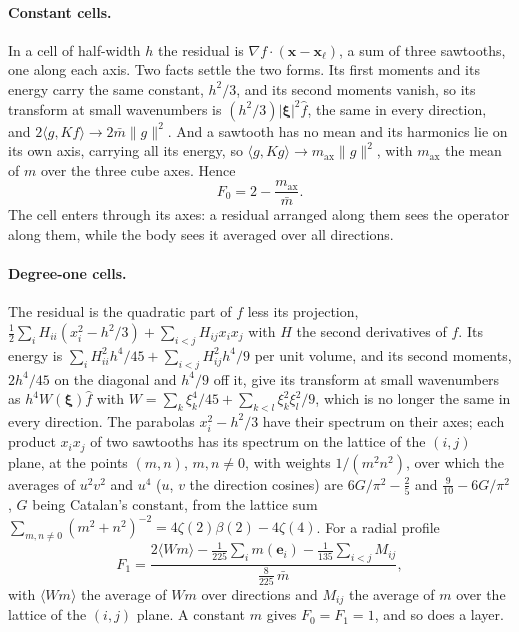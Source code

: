 \documentclass[11pt,a4paper]{article}
\newcommand{\bx}{\mathbf{x}}
\begin{document}
\paragraph{Constant cells.} In a cell of half-width $h$ the residual is $\nabla f\cdot(\bx-\bx_\ell)$, a
sum of three sawtooths, one along each axis. Two facts settle the two forms. Its first moments and its
energy carry the same constant, $h^2/3$, and its second moments vanish, so its transform at small
wavenumbers is $(h^2/3)\lvert\boldsymbol\xi\rvert^2\hat f$, the same in every direction, and
$2\langle g,Kf\rangle\to2\bar m\lVert g\rVert^2$. And a sawtooth has no mean and its harmonics lie
on its own axis, carrying all its energy, so $\langle g,Kg\rangle\to m_{\mathrm{ax}}\lVert
g\rVert^2$, with $m_{\mathrm{ax}}$ the mean of $m$ over the three cube axes. Hence
\begin{equation}\label{eq:F0}
  F_0=2-\frac{m_{\mathrm{ax}}}{\bar m}.
\end{equation}
The cell enters through its axes: a residual arranged along them sees the operator along them, while the
body sees it averaged over all directions.

\paragraph{Degree-one cells.} The residual is the quadratic part of $f$ less its projection,
$\tfrac12\sum_iH_{ii}(x_i^2-h^2/3)+\sum_{i<j}H_{ij}x_ix_j$ with $H$ the second derivatives of $f$.
Its energy is $\sum_iH_{ii}^2h^4/45+\sum_{i<j}H_{ij}^2h^4/9$ per unit volume, and its second moments,
$2h^4/45$ on the diagonal and $h^4/9$ off it, give its transform at small wavenumbers as
$h^4W(\boldsymbol\xi)\hat f$ with
$W=\sum_k\xi_k^4/45+\sum_{k<l}\xi_k^2\xi_l^2/9$, which is no longer the same in every direction. The
parabolas $x_i^2-h^2/3$ have their spectrum on their axes; each product $x_ix_j$ of two sawtooths has its
spectrum on the lattice of the $(i,j)$ plane, at the points $(m,n)$, $m,n\neq0$, with weights
$1/(m^2n^2)$, over which the averages of $u^2v^2$ and $u^4$ ($u$, $v$ the direction cosines) are
$6G/\pi^2-\tfrac25$ and $\tfrac9{10}-6G/\pi^2$, $G$ being Catalan's constant, from the lattice sum
$\sum_{m,n\neq0}(m^2+n^2)^{-2}=4\zeta(2)\beta(2)-4\zeta(4)$. For a radial profile
\begin{equation}\label{eq:F1}
  F_1=\frac{2\langle Wm\rangle-\tfrac1{225}\sum_im(\mathbf{e}_i)-\tfrac1{135}\sum_{i<j}M_{ij}}
            {\tfrac{8}{225}\,\bar m},
\end{equation}
with $\langle Wm\rangle$ the average of $Wm$ over directions and $M_{ij}$ the average of $m$ over the
lattice of the $(i,j)$ plane. A constant $m$ gives $F_0=F_1=1$, and so does a layer.
\end{document}
